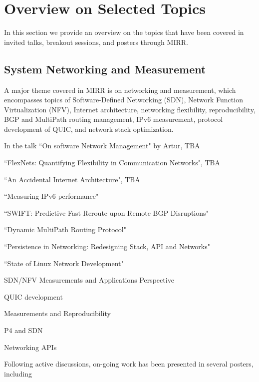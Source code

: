 \section{Overview on Selected Topics} \label{sec:content}

In this section we provide an overview on the topics that have been
covered in invited talks, breakout sessions, and posters through MIRR.

\subsection{System Networking and Measurement}

A major theme covered in MIRR is on networking and measurement, which
encompasses topics of Software-Defined Networking (SDN), Network Function
Virtualization (NFV), Internet architecture, networking flexibility, 
reproducibility, BGP and MultiPath routing management, IPv6 measurement,  
protocol development of QUIC, and network stack optimization. 


In the talk ``On software Network Management" by Artur, TBA

``FlexNets: Quantifying Flexibility in Communication Networks", TBA

``An Accidental Internet Architecture", TBA

``Measuring IPv6 performance"

``SWIFT: Predictive Fast Reroute upon Remote BGP Disruptions"

``Dynamic MultiPath Routing Protocol"

``Persistence in Networking: Redesigning Stack, API and Networks"

``State of Linux Network Development"


SDN/NFV Measurements and Applications Perspective

QUIC development

Measurements and Reproducibility

P4 and SDN

Networking APIs



Following active discussions, on-going work has been presented in 
several posters, including 

